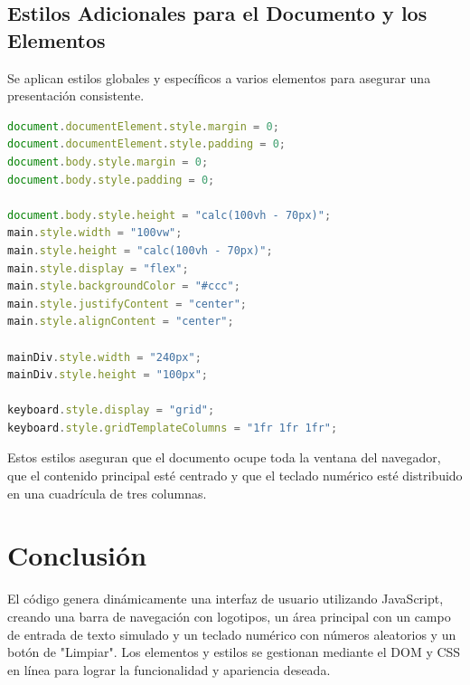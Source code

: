 \subsection*{Estilos Adicionales para el Documento y los Elementos}

Se aplican estilos globales y específicos a varios elementos para asegurar una presentación consistente.

\begin{lstlisting}[language=JavaScript]
document.documentElement.style.margin = 0;
document.documentElement.style.padding = 0;
document.body.style.margin = 0;
document.body.style.padding = 0;

document.body.style.height = "calc(100vh - 70px)";
main.style.width = "100vw";
main.style.height = "calc(100vh - 70px)";
main.style.display = "flex";
main.style.backgroundColor = "#ccc";
main.style.justifyContent = "center";
main.style.alignContent = "center";

mainDiv.style.width = "240px";
mainDiv.style.height = "100px";

keyboard.style.display = "grid";
keyboard.style.gridTemplateColumns = "1fr 1fr 1fr";
\end{lstlisting}

Estos estilos aseguran que el documento ocupe toda la ventana del navegador, que el contenido principal esté centrado y que el teclado numérico esté distribuido en una cuadrícula de tres columnas.

\section*{Conclusión}

El código genera dinámicamente una interfaz de usuario utilizando JavaScript, creando una barra de navegación con logotipos, un área principal con un campo de entrada de texto simulado y un teclado numérico con números aleatorios y un botón de "Limpiar". Los elementos y estilos se gestionan mediante el DOM y CSS en línea para lograr la funcionalidad y apariencia deseada.


